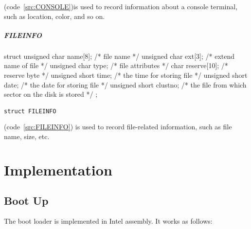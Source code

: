 \documentclass{swfcthesis}
\begin{document}
(code~\ref{src:CONSOLE})is used to record information about a console terminal, such as location,
color, and so on.




\paragraph{FILEINFO}

\begin{listing}[H]
  \begin{codeblock}
\begin{ccode}
struct 
{ 
  unsigned char name[8];   /* file name */
  unsigned char ext[3];    /* extend name of file */
  unsigned char type;      /* file attributes */
  char reserve[10];        /* reserve byte */
  unsigned short time;     /* the time for storing file */
  unsigned short date;     /* the date for storing file */
  unsigned short  clustno; /* the file from which sector on the disk is stored */
};
\end{ccode}
  \end{codeblock}
  \caption{\texttt{struct FILEINFO}}\label{src:FILEINFO}
\end{listing}

(code~\ref{src:FILEINFO}) is used to record file-related information, such as file name, size,
etc.
\fi %


    




\chapter{Implementation}

\section{Boot Up}
\label{sec:boot-up-1}

The boot loader is implemented in Intel assembly. It works as follows:
\end{document}
